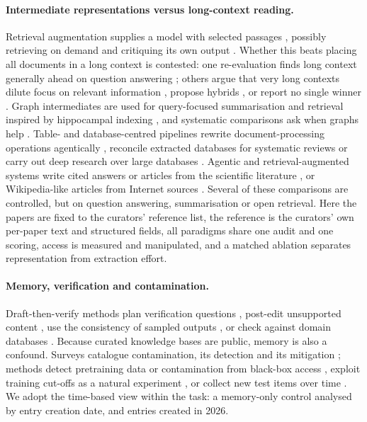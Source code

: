 \documentclass{article} %
\begin{document}
\paragraph{Intermediate representations versus long-context reading.}
Retrieval augmentation supplies a model with selected passages \citep{Lewis2020RetrievalaugmentedGeneration}, possibly retrieving on demand and critiquing its own output \citep{Asai2023SelfragLearning}. Whether this beats placing all documents in a long context is contested: one re-evaluation finds long context generally ahead on question answering \citep{Li2024LongContext}; others argue that very long contexts dilute focus on relevant information \citep{Yu2024DefenseRag}, propose hybrids \citep{li2024retrieval}, or report no single winner \citep{Li2025LaraBenchmarking}. Graph intermediates are used for query-focused summarisation \citep{edge2024local} and retrieval inspired by hippocampal indexing \citep{Gutirrez2024HipporagNeurobiologically}, and systematic comparisons ask when graphs help \citep{han2025rag,xiang2025use}. Table- and database-centred pipelines rewrite document-processing operations agentically \citep{shankar2025docetl}, reconcile extracted databases for systematic reviews \citep{joshi2026sliders} or carry out deep research over large databases \citep{liu2026datastorm}. Agentic and retrieval-augmented systems write cited answers or articles from the scientific literature \citep{Lla2023PaperqaRetrievalaugmented,Asai2024OpenscholarSynthesizing,singh2025ai2,skarlinski2024language}, or Wikipedia-like articles from Internet sources \citep{shao2024assisting}. Several of these comparisons are controlled, but on question answering, summarisation or open retrieval. Here the papers are fixed to the curators' reference list, the reference is the curators' own per-paper text and structured fields, all paradigms share one audit and one scoring, access is measured and manipulated, and a matched ablation separates representation from extraction effort.

\paragraph{Memory, verification and contamination.}
Draft-then-verify methods plan verification questions \citep{dhuliawala2024chainofverification}, post-edit unsupported content \citep{Gao2022RarrResearching}, use the consistency of sampled outputs \citep{Manakul2023SelfcheckgptZeroresource}, or check against domain databases \citep{wang2025geneagent}. Because curated knowledge bases are public, memory is also a confound. Surveys catalogue contamination, its detection and its mitigation \citep{Xu2024BenchmarkData,Deng2024UnveilingSpectrum,Ravaut2024ComprehensiveSurvey,Cheng2025SurveyData,Chen2025RecentAdvances}; methods detect pretraining data or contamination from black-box access \citep{Shi2023DetectingPretraining,oren2024proving,golchin2024time,Golchin2025DataContamination}, exploit training cut-offs as a natural experiment \citep{Roberts2023DataContamination}, or collect new test items over time \citep{Jain2024LivecodebenchHolistic,White2024LivebenchChallenging}. We adopt the time-based view within the task: a memory-only control analysed by entry creation date, and entries created in 2026.
\end{document}
